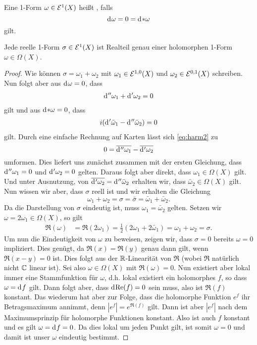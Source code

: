 \begin{defin}
  Eine 1-Form $\omega \in \mathcal{E}^1(X)$ heißt , falls
  \[
  \d[\omega] = 0 = \d[\ast \omega]
  \]
  gilt.
\end{defin}

\begin{thm}
  \label{thm:harm-form}
  Jede reelle 1-Form $\sigma \in \mathcal{E}^1(X)$ ist Realteil genau einer
  holomorphen 1-Form $\omega \in \Omega(X)$.
\end{thm}

\begin{proof}
  Wie können $\sigma = \omega_1 + \omega_2$ mit $\omega_1 \in
  \mathcal{E}^{1,0}(X)$ und $\omega_2 \in \mathcal{E}^{0,1}(X)$ schreiben. Nun
  folgt aber aus $\d[\omega] = 0$, dass
  \begin{align}
    \d[''\omega_1] + \d['\omega_2] = 0 \label{eq:harm1}
  \end{align}
  gilt und aus $\d[\ast \omega] = 0$, dass
  \begin{align}
  i(\d['\bar \omega_1] - \d[''\bar \omega_2]) = 0 \label{eq:harm2}
  \end{align}
  gilt. Durch eine einfache
  Rechnung auf Karten lässt sich \eqref{eq:harm2} zu
  \[
  0 = \overline{\d[''\omega_1]} - \overline{\d['\omega_2]}
  \]
  umformen. Dies liefert uns zunächst zusammen mit der ersten
  Gleichung, dass $\d[''\omega_1] = 0$ und $\d['\omega_2] = 0$
  gelten. Daraus folgt aber direkt, dass $\omega_1 \in \Omega(X)$
  gilt. Und unter Ausnutzung, von $\overline{\d['\omega_2]} = \d[''
  \bar \omega_2]$ erhalten wir, dass $\bar \omega_2 \in \Omega(X)$
  gilt. Nun wissen wir aber, dass $\sigma$ reell ist und wir erhalten
  die Gleichung
  \[
  \omega_1 + \omega_2 = \sigma = \bar \sigma = \bar \omega_1 + \bar
  \omega_2.
  \]
  Da die Darstellung von $\sigma$ eindeutig ist, muss $\omega_1 =
  \bar \omega_2$ gelten. Setzen wir $\omega = 2\omega_1 \in
  \Omega(X)$, so gilt
  \begin{align*}
    \Re(\omega) & = \Re(2\omega_1) = \frac{1}{2}( 2 \omega_1 + 2 \bar
    \omega_1) = \omega_1 + \omega_2 = \sigma.
  \end{align*}
  Um nun die Eindeutigkeit von $\omega$ zu beweisen, zeigen wir, dass
  $\sigma = 0$ bereits $\omega = 0$ impliziert. Dies genügt, da
  $\Re(x) = \Re(y)$ genau dann gilt, wenn $\Re(x-y) = 0$ ist. Dies
  folgt aus der $\mathbb{R}$-Linearität von $\Re$ (wobei $\Re$
  natürlich nicht $\mathbb{C}$ linear ist). Sei also $\omega \in \Omega(X)$
  mit $\Re(\omega) = 0$. Nun existiert aber lokal immer eine
  Stammfunktion für $\omega$, d.h. lokal existiert ein holomorphes
  $f$, so dass $\omega = \d[f]$ gilt. Dann folgt aber, dass
  $\d[\Re(f)] = 0$ sein muss, also ist $\Re(f)$ konstant. Das wiederum
  hat aber zur Folge, dass die holomorphe Funktion $e^f$ ihr
  Betragsmaximum annimmt, denn $|e^f| = e^{\Re(f)}$ gilt. Dann ist
  aber $|e^f|$ nach dem Maximumsprinzip für holomorphe Funktionen
  konstant. Also ist auch $f$ konstant und es gilt $\omega = \d[f] =
  0$. Da dies lokal um jeden Punkt gilt, ist somit $\omega = 0$ und
  damit ist unser $\omega$ eindeutig bestimmt.
\end{proof}

